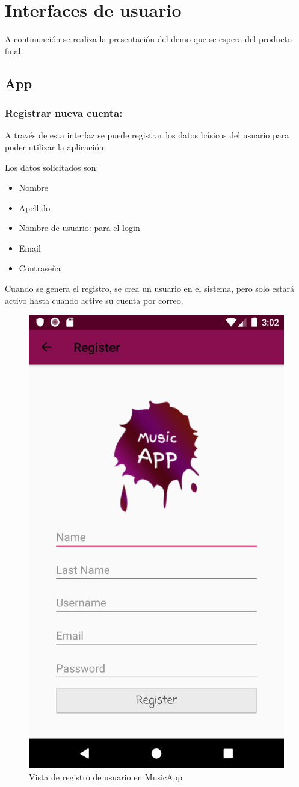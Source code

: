 \section{Interfaces de usuario}
A continuación se realiza la presentación del demo que se espera del producto final.
\subsection{App}

\subsubsection{Registrar nueva cuenta:}
A través de esta interfaz se puede registrar los datos básicos del usuario para poder utilizar la aplicación.

Los datos solicitados son:

\begin{itemize}[noitemsep]
\item Nombre
\item Apellido
\item Nombre de usuario: para el login
\item Email
\item Contraseña
\end{itemize}

Cuando se genera el registro, se crea un usuario en el sistema, pero solo estará activo hasta cuando active su cuenta por correo.

\begin{figure}[h!]
 \centering
\includegraphics[width=0.6\linewidth]{Desarrollo/Interfaces/Interfaces/imgs/register.png}
\caption{Vista de registro de usuario en MusicApp}
\end{figure}

